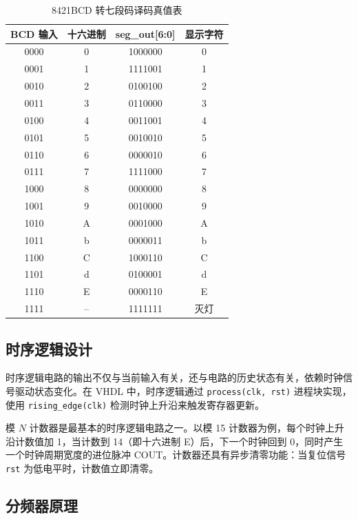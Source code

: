\documentclass{ctexrep}
\begin{document}
\begin{table}[H]
    \centering
    \caption{8421BCD 转七段码译码真值表}
    \label{e4:tab:hex_decode}
    \begin{tabular}{cccc}
        \toprule
        \textbf{BCD 输入} & \textbf{十六进制} & \textbf{seg\_out[6:0]} & \textbf{显示字符} \\
        \midrule
        0000 & 0 & 1000000 & 0 \\
        0001 & 1 & 1111001 & 1 \\
        0010 & 2 & 0100100 & 2 \\
        0011 & 3 & 0110000 & 3 \\
        0100 & 4 & 0011001 & 4 \\
        0101 & 5 & 0010010 & 5 \\
        0110 & 6 & 0000010 & 6 \\
        0111 & 7 & 1111000 & 7 \\
        1000 & 8 & 0000000 & 8 \\
        1001 & 9 & 0010000 & 9 \\
        1010 & A & 0001000 & A \\
        1011 & b & 0000011 & b \\
        1100 & C & 1000110 & C \\
        1101 & d & 0100001 & d \\
        1110 & E & 0000110 & E \\
        1111 & -- & 1111111 & 灭灯 \\
        \bottomrule
    \end{tabular}
\end{table}

\subsection{时序逻辑设计}

时序逻辑电路的输出不仅与当前输入有关，还与电路的历史状态有关，依赖时钟信号驱动状态变化。在 VHDL 中，时序逻辑通过 \texttt{process(clk, rst)} 进程块实现，使用 \texttt{rising\_edge(clk)} 检测时钟上升沿来触发寄存器更新。

模 $N$ 计数器是最基本的时序逻辑电路之一。以模 15 计数器为例，每个时钟上升沿计数值加 1，当计数到 14（即十六进制 E）后，下一个时钟回到 0，同时产生一个时钟周期宽度的进位脉冲 COUT。计数器还具有异步清零功能：当复位信号 \texttt{rst} 为低电平时，计数值立即清零。

\subsection{分频器原理}
\end{document}
